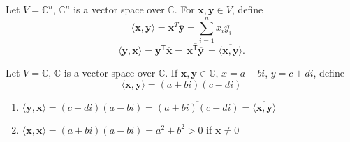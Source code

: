 \begin{eg}
    Let $V = \mathbb{C}^n$, $\mathbb{C}^n$ is a vector space over $\mathbb{C}$. For $\mathbf{x}, \mathbf{y} \in V$, define
    \[
        \langle \mathbf{x}, \mathbf{y} \rangle = \mathbf{x}^T \overline{\mathbf{y}} = \sum_{i=1}^n x_i \overline{y_i}
    \]
    \[
        \langle \mathbf{y}, \mathbf{x} \rangle
        = \mathbf{y}^\mathsf{T} \overline{\mathbf{x}}
        = \overline{\,\mathbf{x}^\mathsf{T} \overline{\mathbf{y}}\,}
        = \overline{\langle \mathbf{x}, \mathbf{y} \rangle}.
    \]
\end{eg}

\newpage

\begin{eg}
    Let $V = \mathbb{C}$, $\mathbb{C}$ is a vector space over $\mathbb{C}$. If $\mathbf{x}, \mathbf{y} \in \mathbb{C}$, $x = a+bi$, $y = c+di$, define
    \[
        \langle \mathbf{x}, \mathbf{y} \rangle = (a + bi)(c - di)
    \]
    \begin{enumerate}[label=$\arabic*^\circ$]
        \item $\langle \mathbf{y}, \mathbf{x} \rangle = (c + di)(a - bi) = \overline{(a + bi)(c - di)} = \overline{\langle \mathbf{x}, \mathbf{y} \rangle}$
        \item $\langle \mathbf{x}, \mathbf{x} \rangle = (a + bi)(a - bi) = a^2 + b^2 > 0$ if $\mathbf{x} \neq 0$
    \end{enumerate}
\end{eg}